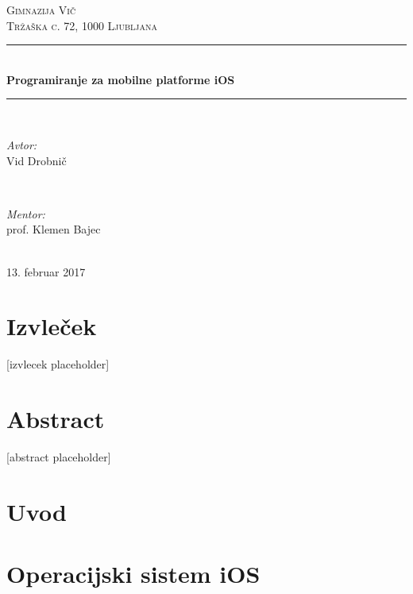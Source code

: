 \documentclass[a4paper, 12pt]{article}
\begin{document}
	\begin{titlepage}
		\newcommand{\HRule}{\rule{\linewidth}{0.5mm}}
		\center
		
		\textsc{\LARGE Gimnazija Vič}\\[0.5cm]
		\textsc{\Large Tržaška c. 72, 1000 Ljubljana}\\[1.5cm]

		\HRule \\[0.4cm]
		{ \huge \bfseries Programiranje za mobilne platforme iOS}\\[0.4cm]
		\HRule \\[1.5cm]
		
		\begin{minipage}{0.4\textwidth}
			\begin{flushleft} \large
				\emph{Avtor:}\\
				Vid Drobnič
			\end{flushleft}
		\end{minipage}
		~
		\begin{minipage}{0.4\textwidth}
			\begin{flushright} \large
				\emph{Mentor:} \\
				prof. Klemen Bajec
			\end{flushright}
		\end{minipage}\\[4cm]
		
		{\large 13. februar 2017}\\[3cm]
		\vfill
	\end{titlepage}
	
	\section*{Izvleček}
	[izvlecek placeholder]
	
	\section*{Abstract}
	[abstract placeholder]
	
	\pagebreak
	
	\tableofcontents
	\pagebreak
	
	\section{Uvod}
	
	
	\section{Operacijski sistem iOS}
	
	
\end{document}
